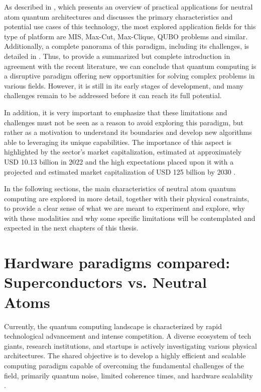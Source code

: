 As described in \cite{grotti2026practicalusecasesneutral}, which presents an overview of practical applications for neutral atom quantum architectures and discusses the primary characteristics and potential use cases of this technology, the most explored application fields for this type of platform are MIS, Max-Cut, Max-Clique, QUBO problems and similar. Additionally, a complete panorama of this paradigm, including its challenges, is detailed in \cite{quantumReport}. Thus, to provide a summarized but complete introduction in agreement with the recent literature, we can conclude that quantum computing is a disruptive paradigm offering new opportunities for solving complex problems in various fields. However, it is still in its early stages of development, and many challenges remain to be addressed before it can reach its full potential.

In addition, it is very important to emphasize that these limitations and challenges must not be seen as a reason to avoid exploring this paradigm, but rather as a motivation to understand its boundaries and develop new algorithms able to leveraging its unique capabilities. The importance of this aspect is highlighted by the sector's market capitalization, estimated at approximately USD 10.13 billion in 2022 and the high expectations placed upon it with a projected and estimated market capitalization of USD 125 billion by 2030 \cite{quantumReport}.

In the following sections, the main characteristics of neutral atom quantum computing are explored in more detail, together with their physical constraints, to provide a clear sense of what we are meant to experiment and explore, why with these modalities and why some specific limitations will be contemplated and expected in the next chapters of this thesis.

\section{Hardware paradigms compared: Superconductors vs. Neutral Atoms}
\label{sec:hardware_paradigms}

Currently, the quantum computing landscape is characterized by rapid technological advancement and intense competition. A diverse ecosystem of tech giants, research institutions, and startups is actively investigating various physical architectures. The shared objective is to develop a highly efficient and scalable computing paradigm capable of overcoming the fundamental challenges of the field, primarily quantum noise, limited coherence times, and hardware scalability \cite{quantumReport}.

